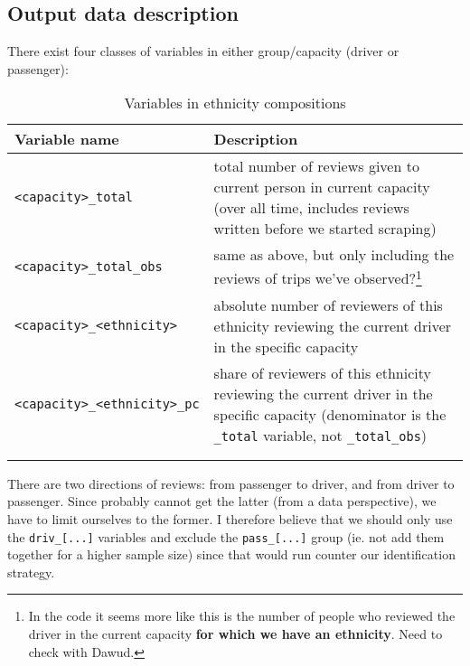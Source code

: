 \documentclass[11pt,a4paper]{article}
\begin{document}
\subsection{Output data description}
There exist four classes of variables in either group/capacity (driver or passenger):


\begin{longtable}{p{50mm}p{100mm}}
	\textbf{Variable name}				& \textbf{Description} \\\hline\hline
	\verb|<capacity>_total|				& total number of reviews given to current person in current capacity (over all time, includes reviews written before we started scraping)																																\\
	\verb|<capacity>_total_obs|			& same as above, but only including the reviews of trips we've observed?\footnote{In the code it seems more like this is the number of people who reviewed the driver in the current capacity \textbf{for which we have an ethnicity}. Need to check with Dawud.}		\\
	\verb|<capacity>_<ethnicity>|	 	& absolute number of reviewers of this ethnicity reviewing the current driver in the specific capacity																																									\\
	\verb|<capacity>_<ethnicity>_pc| 	& share of reviewers of this ethnicity reviewing the current driver in the specific capacity (denominator is the \verb|_total| variable, not \verb|_total_obs|)   	      	   																							\\ \hline \\
\caption{Variables in ethnicity compositions}
\label{tab:varsEthnicityCompositions}
\end{longtable}














There are two directions of reviews: from passenger to driver, and from driver to passenger.
Since probably cannot get the latter (from a data perspective), we have to limit ourselves to the former.
I therefore believe that we should only use the \verb|driv_[...]| variables and exclude the \verb|pass_[...]| group (ie. not add them together for a higher sample size) since that would run counter our identification strategy.
\end{document}
